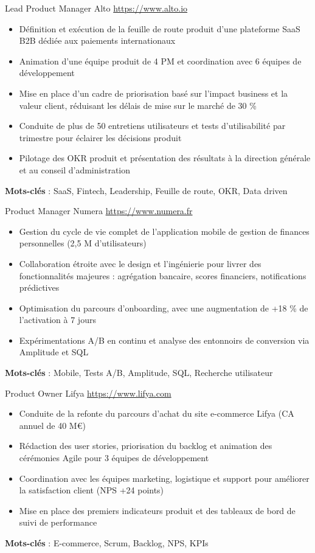 \documentclass[a4paper, serif, 10pt]{moderncv}
\begin{document}
        {Lead Product Manager}
        {Alto}
        {\url{https://www.alto.io}}
        {}
        {\begin{itemize}
\item Définition et exécution de la feuille de route produit d'une plateforme SaaS B2B dédiée aux paiements internationaux
\item Animation d'une équipe produit de 4 PM et coordination avec 6 équipes de développement
\item Mise en place d'un cadre de priorisation basé sur l'impact business et la valeur client, réduisant les délais de mise sur le marché de 30 \%
\item Conduite de plus de 50 entretiens utilisateurs et tests d'utilisabilité par trimestre pour éclairer les décisions produit
\item Pilotage des OKR produit et présentation des résultats à la direction générale et au conseil d'administration
\end{itemize}
\textbf{Mots-clés} : SaaS, Fintech, Leadership, Feuille de route, OKR, Data driven}

        {Product Manager}
        {Numera}
        {\url{https://www.numera.fr}}
        {}
        {\begin{itemize}
\item Gestion du cycle de vie complet de l'application mobile de gestion de finances personnelles (2,5 M d'utilisateurs)
\item Collaboration étroite avec le design et l'ingénierie pour livrer des fonctionnalités majeures : agrégation bancaire, scores financiers, notifications prédictives
\item Optimisation du parcours d'onboarding, avec une augmentation de +18 \% de l'activation à 7 jours
\item Expérimentations A/B en continu et analyse des entonnoirs de conversion via Amplitude et SQL
\end{itemize}
\textbf{Mots-clés} : Mobile, Tests A/B, Amplitude, SQL, Recherche utilisateur}

        {Product Owner}
        {Lifya}
        {\url{https://www.lifya.com}}
        {}
        {\begin{itemize}
\item Conduite de la refonte du parcours d'achat du site e-commerce Lifya (CA annuel de 40 M€)
\item Rédaction des user stories, priorisation du backlog et animation des cérémonies Agile pour 3 équipes de développement
\item Coordination avec les équipes marketing, logistique et support pour améliorer la satisfaction client (NPS +24 points)
\item Mise en place des premiers indicateurs produit et des tableaux de bord de suivi de performance
\end{itemize}
\textbf{Mots-clés} : E-commerce, Scrum, Backlog, NPS, KPIs}
\end{document}
